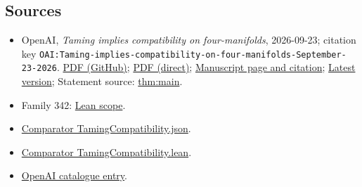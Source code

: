 \documentclass[11pt]{article}
\begin{document}
\subsection{Sources}
\begin{itemize}
\item OpenAI, \emph{Taming implies compatibility on four-manifolds}, 2026-09-23; citation key \texttt{OAI:Taming-implies-compatibility-on-four-manifolds-September-23-2026}. \href{https://github.com/openai/math/blob/adc7f1241b42e322a6451854ab7e4b4c146bf78a/preprints/Taming-implies-compatibility-on-four-manifolds-September-23-2026/paper.pdf}{PDF (GitHub)}; \href{https://github.com/openai/math/raw/adc7f1241b42e322a6451854ab7e4b4c146bf78a/preprints/Taming-implies-compatibility-on-four-manifolds-September-23-2026/paper.pdf}{PDF (direct)}; \href{https://github.com/openai/math/blob/adc7f1241b42e322a6451854ab7e4b4c146bf78a/preprints/Taming-implies-compatibility-on-four-manifolds-September-23-2026/README.md}{Manuscript page and citation}; \href{https://github.com/openai/math/blob/main/preprints/Taming-implies-compatibility-on-four-manifolds-September-23-2026/paper.pdf}{Latest version}; Statement source: \href{https://github.com/openai/math/blob/adc7f1241b42e322a6451854ab7e4b4c146bf78a/preprints/Taming-implies-compatibility-on-four-manifolds-September-23-2026/build/sections/01-introduction.tex\#L23}{thm:main}.
\item Family 342: \href{https://github.com/openai/math/blob/adc7f1241b42e322a6451854ab7e4b4c146bf78a/lean/docs/342.md}{Lean scope}.
\item \href{https://github.com/openai/math/blob/adc7f1241b42e322a6451854ab7e4b4c146bf78a/lean/ComparatorChallenges/TamingCompatibility.json}{Comparator TamingCompatibility.json}.
\item \href{https://github.com/openai/math/blob/adc7f1241b42e322a6451854ab7e4b4c146bf78a/lean/ComparatorChallenges/TamingCompatibility.lean}{Comparator TamingCompatibility.lean}.
\item \href{https://github.com/openai/math/blob/adc7f1241b42e322a6451854ab7e4b4c146bf78a/CONTENTS.md}{OpenAI catalogue entry}.
\end{itemize}
\end{document}
